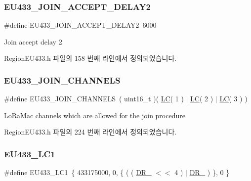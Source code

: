 \subsubsection{\texorpdfstring{E\+U433\+\_\+\+J\+O\+I\+N\+\_\+\+A\+C\+C\+E\+P\+T\+\_\+\+D\+E\+L\+A\+Y2}{EU433\_JOIN\_ACCEPT\_DELAY2}}
{\footnotesize\ttfamily \#define E\+U433\+\_\+\+J\+O\+I\+N\+\_\+\+A\+C\+C\+E\+P\+T\+\_\+\+D\+E\+L\+A\+Y2~6000}

Join accept delay 2 

Region\+E\+U433.\+h 파일의 158 번째 라인에서 정의되었습니다.

\mbox{\label{group___r_e_g_i_o_n_e_u433_ga68f08c679de44a903e7c2b0b57a31e00}} 
\subsubsection{\texorpdfstring{E\+U433\+\_\+\+J\+O\+I\+N\+\_\+\+C\+H\+A\+N\+N\+E\+LS}{EU433\_JOIN\_CHANNELS}}
{\footnotesize\ttfamily \#define E\+U433\+\_\+\+J\+O\+I\+N\+\_\+\+C\+H\+A\+N\+N\+E\+LS~( uint16\+\_\+t )( \mbox{\hyperlink{group___r_e_g_i_o_n_ga12fa17e5c1016e01a9d82c25027deb1b}{LC}}( 1 ) $\vert$ \mbox{\hyperlink{group___r_e_g_i_o_n_ga12fa17e5c1016e01a9d82c25027deb1b}{LC}}( 2 ) $\vert$ \mbox{\hyperlink{group___r_e_g_i_o_n_ga12fa17e5c1016e01a9d82c25027deb1b}{LC}}( 3 ) )}

Lo\+Ra\+Mac channels which are allowed for the join procedure 

Region\+E\+U433.\+h 파일의 224 번째 라인에서 정의되었습니다.

\mbox{\label{group___r_e_g_i_o_n_e_u433_ga6daaeb48d51083fc5de9a57011ec3757}} 
\subsubsection{\texorpdfstring{E\+U433\+\_\+\+L\+C1}{EU433\_LC1}}
{\footnotesize\ttfamily \#define E\+U433\+\_\+\+L\+C1~\{ 433175000, 0, \{ ( ( \mbox{\hyperlink{group___r_e_g_i_o_n_ga872e12c82020c02a7f70a1c6ed1375df}{D\+R\+\_}} $<$$<$ 4 ) $\vert$ \mbox{\hyperlink{group___r_e_g_i_o_n_ga6c4ef966b4f3d5eb7597b087f2b97095}{D\+R\+\_}} ) \}, 0 \}}

